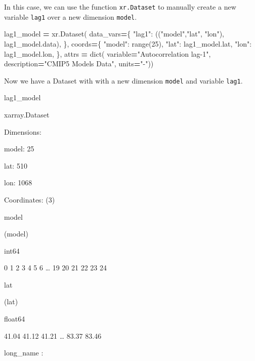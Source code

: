 \documentclass[
]{book}
\newenvironment{Shaded}{\begin{snugshade}}{\end{snugshade}}
\newcommand{\BuiltInTok}[1]{#1}
\newcommand{\DecValTok}[1]{\textcolor[rgb]{0.00,0.00,0.81}{#1}}
\newcommand{\NormalTok}[1]{#1}
\newcommand{\OperatorTok}[1]{\textcolor[rgb]{0.81,0.36,0.00}{\textbf{#1}}}
\newcommand{\StringTok}[1]{\textcolor[rgb]{0.31,0.60,0.02}{#1}}
\begin{document}
In this case, we can use the function \texttt{xr.Dataset} to manually create a new variable \texttt{lag1} over a new dimension \texttt{model}.

\begin{Shaded}
\begin{Highlighting}[]
\NormalTok{lag1\_model }\OperatorTok{=}\NormalTok{ xr.Dataset(}
\NormalTok{    data\_vars}\OperatorTok{=}\NormalTok{\{}
        \StringTok{"lag1"}\NormalTok{: ((}\StringTok{"model"}\NormalTok{,}\StringTok{"lat"}\NormalTok{, }\StringTok{"lon"}\NormalTok{), lag1\_model.data),}
\NormalTok{    \},}
\NormalTok{    coords}\OperatorTok{=}\NormalTok{\{}
        \StringTok{"model"}\NormalTok{: }\BuiltInTok{range}\NormalTok{(}\DecValTok{25}\NormalTok{),}
        \StringTok{"lat"}\NormalTok{: lag1\_model.lat,}
        \StringTok{"lon"}\NormalTok{: lag1\_model.lon,}
\NormalTok{    \},}
\NormalTok{    attrs }\OperatorTok{=} \BuiltInTok{dict}\NormalTok{(}
\NormalTok{        variable}\OperatorTok{=}\StringTok{"Autocorrelation lag{-}1"}\NormalTok{,}
\NormalTok{        description}\OperatorTok{=}\StringTok{"CMIP5 Models Data"}\NormalTok{,}
\NormalTok{        units}\OperatorTok{=}\StringTok{"{-}"}\NormalTok{))}
\end{Highlighting}
\end{Shaded}

Now we have a Dataset with with a new dimension \texttt{model} and variable \texttt{lag1}.

\begin{Shaded}
\begin{Highlighting}[]
\NormalTok{lag1\_model}
\end{Highlighting}
\end{Shaded}

xarray.Dataset

Dimensions:

{model}: 25

{lat}: 510

{lon}: 1068

Coordinates: {(3)}

{model}

(model)

int64

0 1 2 3 4 5 6 \ldots{} 19 20 21 22 23 24

{lat}

(lat)

float64

41.04 41.12 41.21 \ldots{} 83.37 83.46

{long\_name :}
\end{document}

